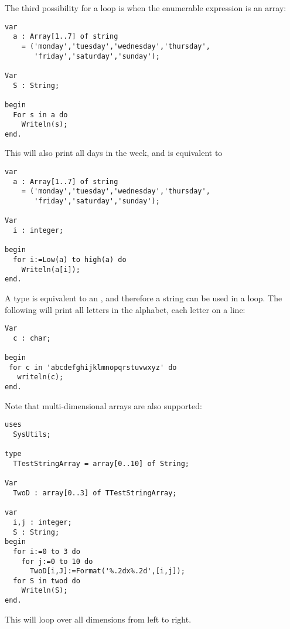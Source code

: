 The third possibility for a  loop is when the enumerable expression 
is an array: 
\begin{verbatim}
var
  a : Array[1..7] of string 
    = ('monday','tuesday','wednesday','thursday',
       'friday','saturday','sunday');
 
Var
  S : String; 
       
begin
  For s in a do
    Writeln(s);
end.
\end{verbatim}
This will also print all days in the week, and is equivalent to 
\begin{verbatim}
var
  a : Array[1..7] of string
    = ('monday','tuesday','wednesday','thursday',
       'friday','saturday','sunday');

Var
  i : integer;

begin
  for i:=Low(a) to high(a) do
    Writeln(a[i]);
end.
\end{verbatim}
A  type is equivalent to an , and therefore
a string can be used in a  loop. The following will
print all letters in the alphabet, each letter on a line:
\begin{verbatim}
Var
  c : char;
  
begin
 for c in 'abcdefghijklmnopqrstuvwxyz' do
   writeln(c);
end.
\end{verbatim}

Note that multi-dimensional arrays are also supported:
\begin{verbatim}
uses
  SysUtils;

type
  TTestStringArray = array[0..10] of String;

Var
  TwoD : array[0..3] of TTestStringArray;

var 
  i,j : integer;
  S : String;
begin
  for i:=0 to 3 do
    for j:=0 to 10 do
      TwoD[i,J]:=Format('%.2dx%.2d',[i,j]);
  for S in twod do
    Writeln(S);
end.
\end{verbatim}
This will loop over all dimensions from left to right.

